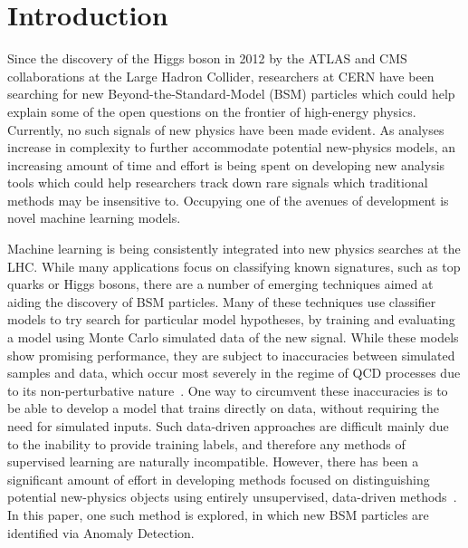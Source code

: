 \documentclass[12pt, a4paper]{article}
\begin{document}
\clearpage







\section{Introduction}

Since the discovery of the Higgs boson in 2012 by the ATLAS and CMS collaborations at the Large Hadron Collider, researchers at CERN have been searching for new Beyond-the-Standard-Model (BSM) particles which could help explain some of the open questions on the frontier of high-energy physics. 
Currently, no such signals of new physics have been made evident. 
As analyses increase in complexity to further accommodate potential new-physics models, an increasing amount of time and effort is being spent on developing new analysis tools which could help researchers track down rare signals which traditional methods may be insensitive to. 
Occupying one of the avenues of development is novel machine learning models.

Machine learning is being consistently integrated into new physics searches at the LHC. 
While many applications focus on classifying known signatures, such as top quarks or Higgs bosons, there are a number of emerging techniques aimed at aiding the discovery of BSM particles. 
Many of these techniques use classifier models to try search for particular model hypotheses, by training and evaluating a model using Monte Carlo simulated data of the new signal.
While these models show promising performance, they are subject to inaccuracies between simulated samples and data, which occur most severely in the regime of QCD processes due to its non-perturbative nature~\cite{pdg}.
One way to circumvent these inaccuracies is to be able to develop a model that trains directly on data, without requiring the need for simulated inputs.
Such data-driven approaches are difficult mainly due to the inability to provide training labels, and therefore any methods of supervised learning are naturally incompatible.
However, there has been a significant amount of effort in developing methods focused on distinguishing potential new-physics objects using entirely unsupervised, data-driven methods~\cite{CWoLa}.
In this paper, one such method is explored, in which new BSM particles are identified via Anomaly Detection.
\end{document}
